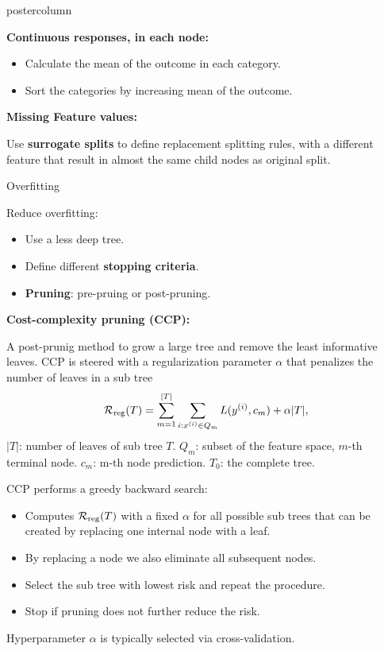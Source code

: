 \documentclass{beamer}
\begin{document}
\begin{frame}[fragile]{}
\begin{columns}
\begin{column}{.31\textwidth}
\begin{beamercolorbox}[center]{postercolumn}
\begin{minipage}{.98\textwidth}
{\begin{myblock}{ }
  \begin{codebox}
  \textbf{Continuous responses, in each node: }
  \end{codebox}
  
  \begin{itemize}[$\bullet$]     
  \setlength{\itemindent}{+.3in}
  \item Calculate the mean of the outcome in each category.
  \item Sort the categories by increasing mean of the outcome.
  \end{itemize}

  \begin{codebox}	
  \textbf{Missing Feature values: }	\end{codebox}
  Use \textbf{surrogate splits} to define replacement splitting rules, with a different feature 
  that result in almost the same child nodes as original split.

  \end{myblock}
  
  \begin{myblock}
    {Overfitting}

  Reduce overfitting:
  \begin{itemize}[$\bullet$]     
  \setlength{\itemindent}{+.3in}
  \item Use a less deep tree.
  \item Define different \textbf{stopping criteria}.
  \item \textbf{Pruning}: pre-pruing or post-pruning.
  \end{itemize}
  
  \begin{codebox}
    \textbf{Cost-complexity pruning (CCP): }
  \end{codebox}
  A post-prunig method to grow a large tree and remove the least informative leaves.
  CCP is steered with a regularization parameter $\alpha$ that penalizes the number of leaves in a sub tree
$$\mathcal{R}_{\text{reg}}(T) = \sum_{m=1}^{|T|} \sum_{i: x^{(i)} \in Q_m} L(y^{(i)}, c_m) + \alpha |T|,$$
$|T|$: number of leaves of sub tree $T$. $Q_m$: subset of the feature space, $m$-th terminal node. $c_m$: m-th node prediction. $T_0$: the complete tree.

CCP performs a greedy backward search:
\begin{itemize}[$\bullet$]     
  \setlength{\itemindent}{+.3in}
\item Computes $\mathcal{R}_{\text{reg}}(T)$ with a fixed $\alpha$ for all possible sub trees that can be created by replacing one internal node with a leaf.
\item By replacing a node we also eliminate all subsequent nodes.
\item Select the sub tree with lowest risk and repeat the procedure.
\item Stop if pruning does not further reduce the risk.
\end{itemize}
Hyperparameter $\alpha$ is typically selected via cross-validation.


\end{myblock}}
\end{minipage}
\end{beamercolorbox}
\end{column}
\end{columns}
\end{frame}
\end{document}
